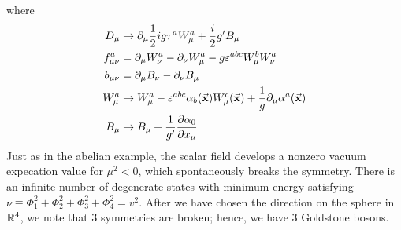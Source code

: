 \documentclass[../../Main/Main.tex]{subfiles}
\begin{document}
where
\begin{subequations}
\begin{align*}
     D_ \mu  &\rightarrow \partial_ \mu \frac{1}{2} i g \tau ^a W_ \mu ^a + \frac{i}{2} g' B _ \mu \\
  f_ {\mu \nu }^a &= \partial_ \mu W_ \nu ^a - \partial_ \nu W _ \mu ^a - g \varepsilon ^{abc} W _ \mu ^b  W_ \nu ^a \\
  b_ {\mu \nu } &= \partial_ \mu B _ \nu - \partial_ \nu  B _ \mu \\
  W_ \mu ^a & \rightarrow W_ \mu ^a - \varepsilon ^{abc} \alpha _b (\va{x}) W_ \mu ^c (\va{x}) + \frac{1}{g} \partial_ \mu \alpha ^a (\va{x})    \\
  B _ \mu  & \rightarrow  B _ \mu + \frac{1}{g'} \pdv{\alpha _0}{x_ \mu }
\end{align*}
\end{subequations}
Just as in the abelian example, the scalar field develops a nonzero vacuum expecation value for \( \mu ^2 <0 \), which spontaneously breaks the symmetry. There is an infinite number of degenerate states with minimum energy satisfying  \( \nu \equiv  \Phi _1^2 + \Phi _2^2 + \Phi _3^2 +\Phi _4^2 = v^2 \). After we have chosen the direction on the sphere in  \( \mathbb{R}^4 \), we note that 3 symmetries are broken; hence, we have 3 Goldstone bosons.
\end{document}
